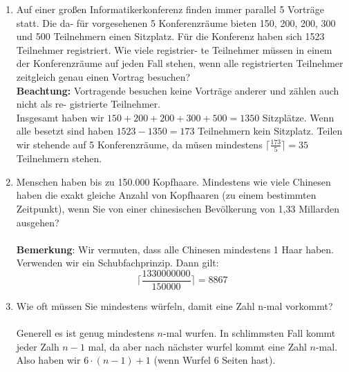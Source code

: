 \begin{enumerate}[label=(\alph*)]
        \item Auf einer großen Informatikerkonferenz finden immer parallel 5 Vorträge statt. Die da-
		für vorgesehenen 5 Konferenzräume bieten 150, 200, 200, 300 und 500 Teilnehmern einen
		Sitzplatz. Für die Konferenz haben sich 1523 Teilnehmer registriert. Wie viele registrier-
		te Teilnehmer müssen in einem der Konferenzräume auf jeden Fall stehen, wenn alle
		registrierten Teilnehmer zeitgleich genau einen Vortrag besuchen?\\
		\textbf{Beachtung:} Vortragende besuchen keine Vorträge anderer und zählen auch nicht als re-
		gistrierte Teilnehmer.\\
		Insgesamt haben wir $150+200+200+300+500 = 1350$ Sitzpl\"atze. Wenn alle besetzt sind haben 
		$1523-1350=173$ Teilnehmern kein Sitzplatz. Teilen wir stehende auf 5 Konferenzräume, da 
		m\"usen mindestens $\Big\lceil\frac{173}{5}\Big\rceil = 35$ Teilnehmern stehen. 
        
        \item Menschen haben bis zu 150.000 Kopfhaare. Mindestens wie viele Chinesen haben die
		exakt gleiche Anzahl von Kopfhaaren (zu einem bestimmten Zeitpunkt), wenn Sie von
		einer chinesischen Bevölkerung von 1,33 Millarden ausgehen?\\\\
		\textbf{Bemerkung}: Wir vermuten, dass alle Chinesen mindestens 1 Haar haben.\\
		Verwenden wir ein Schubfachprinzip. Dann gilt:
		\[\bigg\lceil\frac{1330000000}{150000}\bigg\rceil = 8867\]
		
        \item Wie oft müssen Sie mindestens würfeln, damit eine Zahl n-mal vorkommt?\\\\
        Generell es ist genug mindestens $n$-mal wurfen. In schlimmsten Fall kommt jeder Zalh $n-1$ mal,
        da aber nach n\"achster wurfel kommt eine Zahl $n$-mal. Also haben wir $6\cdot(n-1)+1$ 
        (wenn Wurfel 6 Seiten hast).
    \end{enumerate}
